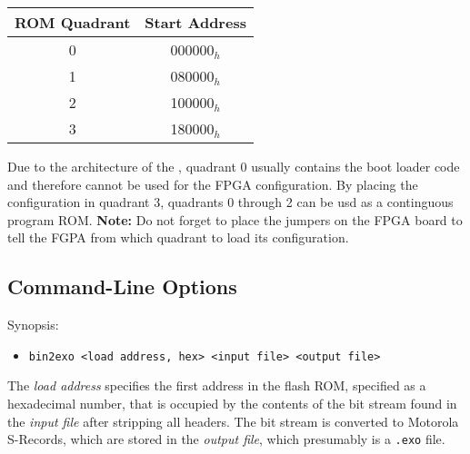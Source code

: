 \begin{tabular}{|c|c|}
\hline
ROM Quadrant & Start Address\\
\hline
0 & 000000$_h$ \\
\hline
1 & 080000$_h$ \\
\hline
2 & 100000$_h$ \\
\hline
3 & 180000$_h$ \\
\hline
\end{tabular}

Due to the architecture of the \ecox, quadrant 0 usually contains the boot loader code and therefore cannot be used for the FPGA configuration. By placing the configuration in quadrant 3, quadrants 0 through 2 can be usd as a continguous program ROM. {\bf Note:} Do not forget to place the jumpers on the FPGA board to tell the FGPA from which quadrant to load its configuration.

\subsection{Command-Line Options}

Synopsis:
\begin{itemize}
\item[] {\tt bin2exo <load address, hex> <input file> <output file>}
\end{itemize}

The {\it load address} specifies the first address in the flash ROM, specified as a hexadecimal number, that is occupied by the contents of the bit stream found in the {\it input file} after stripping all headers. The bit stream is converted to Motorola S-Records, which are stored in the {\it output file}, which presumably is a {\tt .exo} file.



